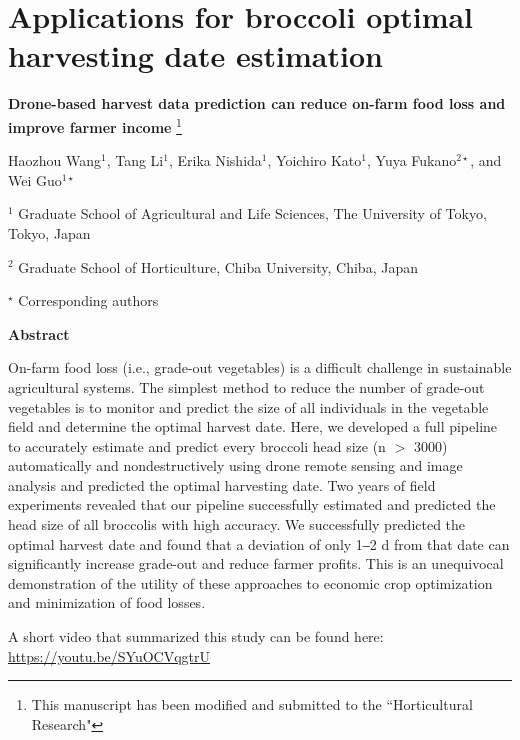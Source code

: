 \chapter{Applications for broccoli optimal harvesting date estimation}

\begin{center}

\textbf{Drone-based harvest data prediction can reduce on-farm food loss and improve farmer income} \footnote[1]{This manuscript has been modified and submitted to the ``Horticultural Research"}

\end{center}

\noindent Haozhou Wang$^{1}$, Tang Li$^{1}$, Erika Nishida$^{1}$, Yoichiro Kato$^{1}$, Yuya Fukano$^{2\star}$, and Wei Guo$^{1\star}$

\noindent $^{1}$ Graduate School of Agricultural and Life Sciences, The University of Tokyo, Tokyo, Japan

\noindent $^{2}$ Graduate School of Horticulture, Chiba University, Chiba, Japan

\noindent $^{\star}$ Corresponding authors

\hspace*{\fill}

\noindent \textbf{Abstract}

\hspace*{\fill}

On-farm food loss (i.e., grade-out vegetables) is a difficult challenge in sustainable agricultural systems. The simplest method to reduce the number of grade-out vegetables is to monitor and predict the size of all individuals in the vegetable field and determine the optimal harvest date. Here, we developed a full pipeline to accurately estimate and predict every broccoli head size (n $>$ 3000) automatically and nondestructively using drone remote sensing and image analysis and predicted the optimal harvesting date. Two years of field experiments revealed that our pipeline successfully estimated and predicted the head size of all broccolis with high accuracy. We successfully predicted the optimal harvest date and found that a deviation of only 1‒2 d from that date can significantly increase grade-out and reduce farmer profits. This is an unequivocal demonstration of the utility of these approaches to economic crop optimization and minimization of food losses.

A short video that summarized this study can be found here: \url{https://youtu.be/SYuOCVqgtrU}


